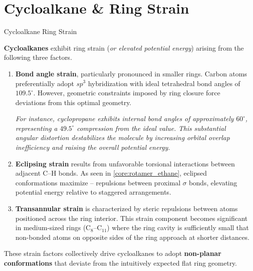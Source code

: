 \documentclass[10pt]{article}
\begin{document}
\section{Cycloalkane \& Ring Strain}

  \begin{core}{Cycloalkane Ring Strain}
 
    \textbf{Cycloalkanes} exhibit ring strain (\textit{or elevated potential energy}) arising from the following three factors.

      \begin{enumerate}

        \item \textbf{Bond angle strain}, particularly pronounced in smaller rings. Carbon atoms preferentially adopt $sp^3$ hybridization with ideal tetrahedral bond angles of $109.5^{\circ}$. However, geometric constraints imposed by ring closure force deviations from this optimal geometry. 

        \textit{For instance, cyclopropane exhibits internal bond angles of approximately $60^{\circ}$, representing a $49.5^{\circ}$ compression from the ideal value. This substantial angular distortion destabilizes the molecule by increasing orbital overlap inefficiency and raising the overall potential energy.}

        \item \textbf{Eclipsing strain} results from unfavorable torsional interactions between adjacent C--H bonds. As seen in \autoref{core:rotamer_ethane}, eclipsed conformations maximize -- repulsions between proximal $\sigma$ bonds, elevating potential energy relative to staggered arrangements.

        \item \textbf{Transannular strain} is characterized by steric repulsions between atoms positioned across the ring interior. This strain component becomes significant in medium-sized rings (C$_8$--C$_{11}$) where the ring cavity is sufficiently small that non-bonded atoms on opposite sides of the ring approach at shorter distances.

      \end{enumerate} 
      
      These strain factors collectively drive cycloalkanes to adopt \textbf{non-planar conformations} that deviate from the intuitively expected flat ring geometry.


  \end{core}
\end{document}
